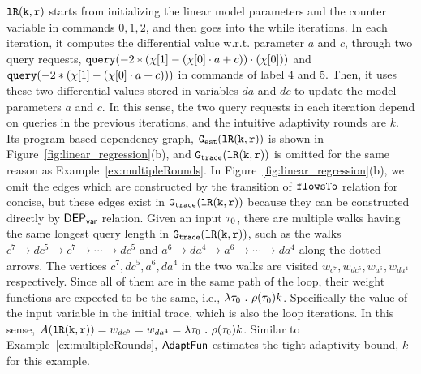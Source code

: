     $\mathtt{lR(k, r)}$ starts from initializing the linear model parameters and the counter variable in commands $0, 1, 2$,
    and then goes into the while iterations.
    In each iteration, it computes the differential value w.r.t. parameter
    $a$ and $c$,
    through two query requests, 
    ${\tt query}(-2 * (\chi[1] - (\chi[0]\cdot a + c)) \cdot (\chi[0]))$ and 
    ${\tt query}(-2 * (\chi[1] - (\chi[0]\cdot a + c)))$
    in commands of label $4$ and $5$.
    Then, it uses these two differential values stored in variables $da$ and $dc$
    to update the model parameters $a$ and $c$.
    In this sense, the two query requests in each iteration depend on queries in the previous iterations, and the intuitive adaptivity rounds are $k$.
    Its program-based dependency graph, $\mathtt{{G_{est}}}(\mathtt{lR(k, r)})$ is shown in Figure~\ref{fig:linear_regression}(b),
    and $\mathtt{{G_{trace}}}(\mathtt{lR(k, r)})$ is omitted for the same reason as Example~\ref{ex:multipleRounds}.
     In Figure~\ref{fig:linear_regression}(b), we omit the edges which are constructed by the transition of $\mathtt{flowsTo}$ relation
    for concise, but these edges exist in $\mathtt{{G_{trace}}}(\mathtt{lR(k, r)})$ because they can be constructed directly by $\mathsf{DEP_{var}}$ relation.
    Given an input $\mathtt{\tau}_0$, there are multiple walks having the same longest query length in 
    $\mathtt{{G_{trace}}}(\mathtt{lR(k, r)})$,
    such as the walks 
    $c^7 \to dc^5 \to c^7 \to \cdots \to dc^5$ and
    $a^6 \to da^4 \to a^6 \to \cdots \to da^4 $ along the 
    dotted arrows.
    The vertices $c^7, dc^5, a^6, da^4$ in the two walks are visited $w_{c^7}, w_{dc^5}, w_{a^6}, w_{da^4}$ respectively.
    Since all of them are in the same path of the loop, their weight functions are expected to be the same, i.e., 
    $\lambda \mathtt{\tau}_0 ~.~ \rho(\mathtt{\tau}_0) k$. 
    Specifically the value of the input variable in the initial trace, which is also the loop iterations.
    In this sense, $A(\mathtt{lR(k, r)}) = w_{dc^5} = w_{da^4} = \lambda \mathtt{\tau}_0 ~.~ \rho(\mathtt{\tau}_0) k$.
    Similar to Example~\ref{ex:multipleRounds}, $\textsf{AdaptFun}$ estimates the tight adaptivity bound, $k$ for this example.